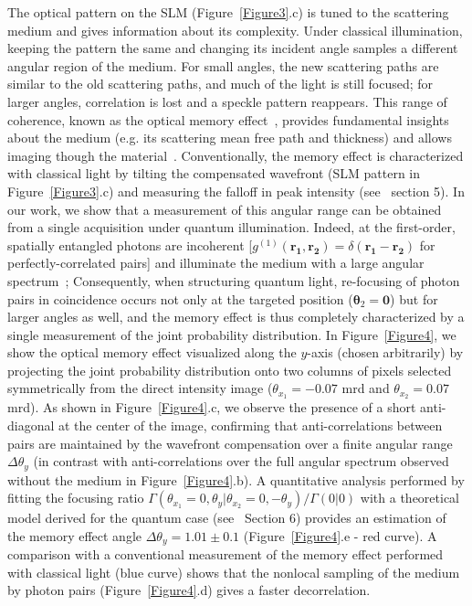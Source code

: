 \documentclass[%
 reprint,
 amsmath,amssymb,
 aps
]{revtex4-1}
\begin{document}
The optical pattern on the SLM (Figure~\ref{Figure3}.c) is tuned to the scattering medium and gives information about its complexity. Under classical illumination, keeping the pattern the same and changing its incident angle samples a different angular region of the medium. For small angles, the new scattering paths are similar to the old scattering paths, and much of the light is still focused; for larger angles, correlation is lost and a speckle pattern reappears. This range of coherence, known as the optical memory effect~\cite{freund_memory_1988}, provides fundamental insights about the medium (e.g. its scattering mean free path and thickness) and allows imaging though the material~\cite{bertolotti_non-invasive_2012}. Conventionally, the memory effect is characterized with classical light by tilting the compensated wavefront (SLM pattern in Figure~\ref{Figure3}.c) and measuring the falloff in peak intensity  (see~\cite{supmat} section 5). In our work, we show that a measurement of this angular range can be obtained from a single acquisition under quantum illumination. Indeed, at the first-order, spatially entangled photons are incoherent [$g^{(1)}(\boldsymbol{r_1},\boldsymbol{r_2}) = \delta(\boldsymbol{r_1}-\boldsymbol{r_2})$ for perfectly-correlated pairs] and illuminate the medium with a large angular spectrum~\cite{saleh_duality_2000}; Consequently, when structuring quantum light, re-focusing of photon pairs in coincidence occurs not only at the targeted position ($\boldsymbol{\theta}_2=\boldsymbol{0}$) but for larger angles as well, and the memory effect is thus completely characterized by a single measurement of the joint probability distribution. In Figure~\ref{Figure4}, we show the optical memory effect visualized along the $y$-axis (chosen arbitrarily) by projecting the joint probability distribution onto two columns of pixels selected symmetrically from the direct intensity image ($\theta_{x_1} = -0.07$ mrd and $\theta_{x_2} = 0.07$ mrd). As shown in Figure~\ref{Figure4}.c, we observe the presence of a short anti-diagonal at the center of the image, confirming that anti-correlations between pairs are maintained by the wavefront compensation over a finite angular range $\Delta \theta_y$ (in contrast with anti-correlations over the full angular spectrum observed without the medium in Figure~\ref{Figure4}.b). A quantitative analysis performed by fitting the focusing ratio $\Gamma(\theta_{x_1}=0,\theta_{y}|\theta_{x_2}=0,-\theta_{y})/\Gamma(0|0)$ with a theoretical model derived for the quantum case (see~\cite{supmat} Section 6) provides an estimation of the memory effect angle $\Delta \theta_y= 1.01 \pm 0.1$ (Figure~\ref{Figure4}.e - red curve). A comparison with a conventional measurement of the memory effect performed with classical light (blue curve) shows that the nonlocal sampling of the medium by photon pairs (Figure~\ref{Figure4}.d) gives a faster decorrelation. 
\end{document}
